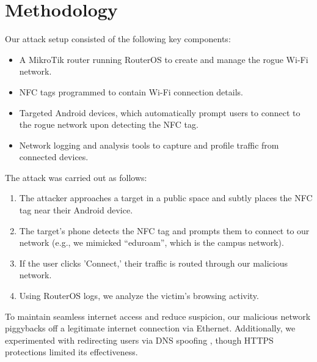 \documentclass[sigconf]{acmart}
\begin{document}
\section{Methodology}
Our attack setup consisted of the following key components:
\begin{itemize}
    \item A MikroTik router running RouterOS to create and manage the rogue Wi-Fi network.
    \item NFC tags programmed to contain Wi-Fi connection details.
    \item Targeted Android devices, which automatically prompt users to connect to the rogue network upon detecting the NFC tag.
    \item Network logging and analysis tools to capture and profile traffic from connected devices.
\end{itemize}

The attack was carried out as follows:
\begin{enumerate}
    \item The attacker approaches a target in a public space and subtly places the NFC tag near their Android device.
    \item The target's phone detects the NFC tag and prompts them to connect to our network (e.g., we mimicked “eduroam”, which is the campus network).
    \item If the user clicks 'Connect,' their traffic is routed through our malicious network.
    \item Using RouterOS logs, we analyze the victim's browsing activity.
\end{enumerate}

To maintain seamless internet access and reduce suspicion, our malicious network piggybacks off a legitimate internet connection via Ethernet. Additionally, we experimented with redirecting users via DNS spoofing \cite{dns}, though HTTPS protections limited its effectiveness.
\end{document}
